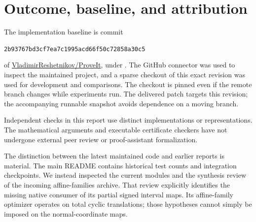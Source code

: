 \documentclass[11pt,a4paper]{article}
\theoremstyle{definition}\newtheorem{definition}[theorem]{Definition}
\theoremstyle{remark}\newtheorem{remark}[theorem]{Remark}
\begin{document}
\section{Outcome, baseline, and attribution}
\label{sec:outcome}

The implementation baseline is commit
\begin{center}\small\texttt{2b93767bd3cf7ea7c1995acd66f50c72858a30c5}\end{center}
of \href{https://github.com/VladimirReshetnikov/ProveIt}{VladimirReshetnikov/ProveIt},
under . The GitHub connector was used to inspect
the maintained project, and a sparse checkout of this exact revision was used
for development and comparisons. The checkout is pinned even if the remote
branch changes while experiments run. The delivered patch targets this revision;
the accompanying runnable snapshot avoids dependence on a moving branch.

Independent checks in this report use distinct implementations or
representations. The mathematical arguments and executable certificate
checkers have not undergone external peer review or proof-assistant
formalization.

The distinction between the latest maintained code and earlier reports is
material. The main README contains historical test counts and integration
checkpoints. We instead inspected the current modules and the synthesis review
of the incoming affine-families archive. That review explicitly identifies the
missing native consumer of its partial signed interval maps. Its affine-family
optimizer operates on total cyclic translations; those hypotheses cannot simply
be imposed on the normal-coordinate maps.
\end{document}
